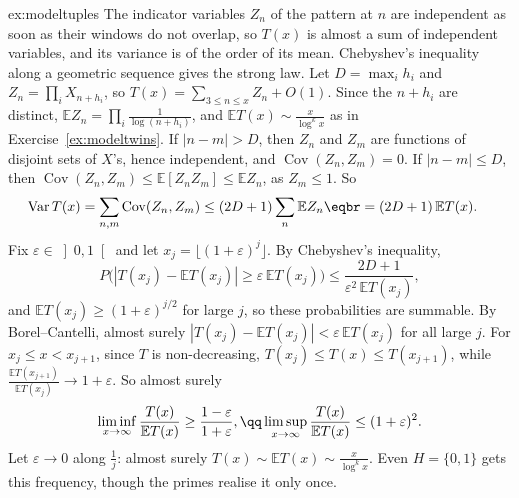 \begin{solution}{ex:modeltuples}
\idea The indicator variables $Z_n$ of the pattern at $n$ are independent as soon as their windows do not overlap, so $T(x)$ is almost a sum of independent variables, and its variance is of the order of its mean.
Chebyshev's inequality along a geometric sequence gives the strong law.
\writeup Let $D=\max_ih_i$ and $Z_n=\prod_iX_{n+h_i}$, so $T(x)=\sum_{3\le n\le x}Z_n+O(1)$. Since the $n+h_i$ are distinct, $\mathbb EZ_n=\prod_i\frac1{\log(n+h_i)}$, and
$\mathbb ET(x)\sim\frac x{\log^kx}$ as in Exercise~\ref{ex:modeltwins}. If $|n-m|>D$, then $Z_n$ and $Z_m$ are functions of disjoint sets of $X$'s, hence independent, and $\operatorname{Cov}(Z_n,Z_m)=0$.
If $|n-m|\le D$, then $\operatorname{Cov}(Z_n,Z_m)\le\mathbb E[Z_nZ_m]\le\mathbb EZ_n$, as $Z_m\le1$. So
\[
\begin{aligned}\operatorname{Var}T(x)&=\sum_{n,m}\operatorname{Cov}(Z_n,Z_m)\le(2D+1)\sum_n\mathbb EZ_n\eqbr=(2D+1)\,\mathbb ET(x).\end{aligned}
\]
Fix $\varepsilon\in\left]0,1\right[$ and let $x_j=\lfloor(1+\varepsilon)^j\rfloor$. By Chebyshev's inequality,
\[
P\bigl(|T(x_j)-\mathbb ET(x_j)|\ge\varepsilon\,\mathbb ET(x_j)\bigr)\le\frac{2D+1}{\varepsilon^2\,\mathbb ET(x_j)},
\]
and $\mathbb ET(x_j)\ge(1+\varepsilon)^{j/2}$ for large $j$, so these probabilities are summable. By Borel--Cantelli, almost surely $|T(x_j)-\mathbb ET(x_j)|<\varepsilon\,\mathbb ET(x_j)$ for all large $j$.
For $x_j\le x<x_{j+1}$, since $T$ is non-decreasing, $T(x_j)\le T(x)\le T(x_{j+1})$, while $\frac{\mathbb ET(x_{j+1})}{\mathbb ET(x_j)}\to1+\varepsilon$. So almost surely
\[
\begin{gathered}\liminf_{x\to\infty}\frac{T(x)}{\mathbb ET(x)}\ge\frac{1-\varepsilon}{1+\varepsilon},\qq\limsup_{x\to\infty}\frac{T(x)}{\mathbb ET(x)}\le(1+\varepsilon)^2.\end{gathered}
\]
Let $\varepsilon\to0$ along $\frac1j$: almost surely $T(x)\sim\mathbb ET(x)\sim\frac x{\log^kx}$. Even $H=\{0,1\}$ gets this frequency, though the primes realise it only once.
\end{solution}


